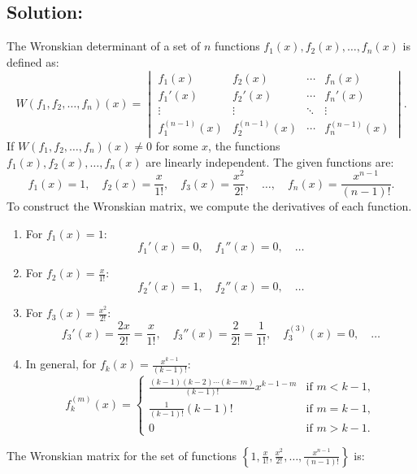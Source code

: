 \documentclass[12pt]{article}
\begin{document}
    \subsection*{Solution:}
        The Wronskian determinant of a set of \(n\) functions \(f_1(x), f_2(x), \ldots, f_n(x)\) is defined as:
        \[
        W(f_1, f_2, \ldots, f_n)(x) = 
        \begin{vmatrix}
        f_1(x) & f_2(x) & \cdots & f_n(x) \\
        f_1'(x) & f_2'(x) & \cdots & f_n'(x) \\
        \vdots & \vdots & \ddots & \vdots \\
        f_1^{(n-1)}(x) & f_2^{(n-1)}(x) & \cdots & f_n^{(n-1)}(x)
        \end{vmatrix}.
        \]
        If \(W(f_1, f_2, \ldots, f_n)(x) \neq 0\) for some \(x\), the functions \(f_1(x), f_2(x), \ldots, f_n(x)\) are linearly independent.
        The given functions are:
        \[
        f_1(x) = 1, \quad f_2(x) = \frac{x}{1!}, \quad f_3(x) = \frac{x^2}{2!}, \quad \ldots, \quad f_n(x) = \frac{x^{n-1}}{(n-1)!}.
        \]
        To construct the Wronskian matrix, we compute the derivatives of each function.
        \begin{enumerate}      
            \item For \(f_1(x) = 1\):
            \[
            f_1'(x) = 0, \quad f_1''(x) = 0, \quad \ldots
            \]
            \item For \(f_2(x) = \frac{x}{1!}\):
            \[
            f_2'(x) = 1, \quad f_2''(x) = 0, \quad \ldots
            \]
            \item For \(f_3(x) = \frac{x^2}{2!}\):
            \[
            f_3'(x) = \frac{2x}{2!} = \frac{x}{1!}, \quad f_3''(x) = \frac{2}{2!} = \frac{1}{1!}, \quad f_3^{(3)}(x) = 0, \quad \ldots
            \]
            \item In general, for \(f_k(x) = \frac{x^{k-1}}{(k-1)!}\):
            \[
            f_k^{(m)}(x) =
            \begin{cases} 
            \frac{(k-1)(k-2)\cdots(k-m)}{(k-1)!} x^{k-1-m} & \text{if } m < k-1, \\
            \frac{1}{(k-1)!} (k-1)! & \text{if } m = k-1, \\
            0 & \text{if } m > k-1.
            \end{cases}
            \]
        \end{enumerate}
        The Wronskian matrix for the set of functions \(\left\{1, \frac{x}{1!}, \frac{x^2}{2!}, \ldots, \frac{x^{n-1}}{(n-1)!}\right\}\) is:
\end{document}
